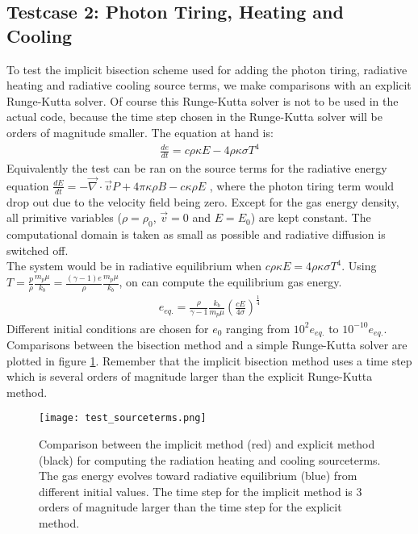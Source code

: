 \subsection{Testcase 2: Photon Tiring, Heating and Cooling}
To test the implicit bisection scheme used for adding the photon tiring, radiative heating and radiative cooling source terms, we make comparisons with an explicit Runge-Kutta solver. Of course this Runge-Kutta solver is not to be used in the actual code, because the time step chosen in the Runge-Kutta solver will be orders of magnitude smaller. The equation at hand is:
\begin{align}
\frac{d e}{dt} = c \rho \kappa E - 4 \rho \kappa \sigma T^4
\end{align}
Equivalently the test can be ran on the source terms for the radiative energy equation $\frac{dE}{dt} = - \vec{\nabla} \cdot \vec{v} P + 4\pi \kappa\rho B - c \kappa \rho E$ , where the photon tiring term would drop out due to the velocity field being zero.
Except for the gas energy density, all primitive variables ($\rho = \rho_0$, $\vec{v} = 0$ and $E = E_0$) are kept constant. The computational domain is taken as small as possible and radiative diffusion is switched off. \\

The system would be in radiative equilibrium when $c \rho \kappa E = 4 \rho \kappa \sigma T^4$. Using $T =  \frac{p}{\rho} \frac{m_p \mu}{k_b}= \frac{(\gamma - 1)e}{\rho} \frac{m_p \mu}{k_b}$, on can compute the equilibrium gas energy.
\begin{align}
e_{eq.} = \frac{\rho}{\gamma - 1} \frac{k_b}{m_p \mu}\left( \frac{c E}{4 \sigma} \right)^\frac{1}{4}
\end{align}
Different initial conditions are chosen for $e_0$ ranging from $10^2 e_{eq.}$ to $10^{-10} e_{eq.}$. Comparisons between the bisection method and a simple Runge-Kutta solver are plotted in figure \ref{fig: test_sourceterms}. Remember that the implicit bisection method uses a time step which is several orders of magnitude larger than the explicit Runge-Kutta method.

\begin{figure}
\texttt{[image: test\_sourceterms.png]}
\label{fig: test_sourceterms}
\caption{Comparison between the implicit method (red) and explicit method (black) for computing the radiation heating and cooling sourceterms. The gas energy evolves toward radiative equilibrium (blue) from different initial values. The time step for the implicit method is 3 orders of magnitude larger than the time step for the explicit method.}
\end{figure}

